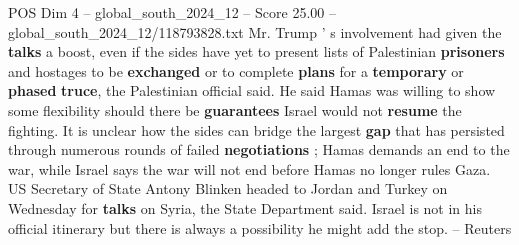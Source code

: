 \begin{textsample}{POS Dim 4 – global\_south\_2024\_12 – Score 25.00 – global\_south\_2024\_12/118793828.txt}
Mr.
Trump ' s involvement had given the \textbf{talks} a boost, even if the sides have yet to present lists of Palestinian \textbf{prisoners} and hostages to be \textbf{exchanged} or to complete \textbf{plans} for a \textbf{temporary} or \textbf{phased} \textbf{truce}, the Palestinian official said.
He said Hamas was willing to show some flexibility should there be \textbf{guarantees} Israel would not \textbf{resume} the fighting.
It is unclear how the sides can bridge the largest \textbf{gap} that has persisted through numerous rounds of failed \textbf{negotiations} ; Hamas demands an end to the war, while Israel says the war will not end before Hamas no longer rules Gaza.
US Secretary of State Antony Blinken headed to Jordan and Turkey on Wednesday for \textbf{talks} on Syria, the State Department said.
Israel is not in his official itinerary but there is always a possibility he might add the stop. -- Reuters

\end{textsample}
